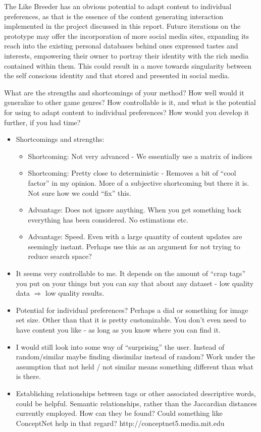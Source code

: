 \documentclass[]{article}
\begin{document}
The Like Breeder has an obvious potential to adapt content to individual preferences, as that is the essence of the content generating interaction implemented in the project discussed in this report.  Future iterations on the prototype may offer the incorporation of more social media sites, expanding its reach into the existing personal databases behind ones expressed tastes and interests, empowering their owner to portray their identity with the rich media contained within them.  This could result in a move towards singularity between the self conscious identity and that stored and presented in social media.

\begin{framed}
What are the strengths and shortcomings of your method? How well would it generalize to other game genres? How controllable is it, and what is the potential for using to adapt content to individual preferences? How would you develop it further, if you had time?
\end{framed}
\begin{itemize}
\item Shortcomings and strengths:
	\begin{itemize}
	\item Shortcoming: Not very advanced - We essentially use a matrix of indices
	\item Shortcoming: Pretty close to deterministic - Removes a bit of ``cool factor'' in my opinion. More of a subjective shortcoming but there it is. Not sure how we could ``fix'' this.
	\item Advantage: Does not ignore anything. When you get something back everything has been considered. No estimations etc.
	\item Advantage: Speed. Even with a large quantity of content updates are seemingly instant. Perhaps use this as an argument for not trying to reduce search space?
	\end{itemize}
\item  It seems very controllable to me. It depends on the amount of ``crap tags'' you put on your things but you can say that about any dataset - low quality data $\Rightarrow$ low quality results. 
\item Potential for individual preferences? Perhaps a dial or something for image set size. Other than that it is pretty customizable. You don't even need to have content you like - as long as you know where you can find it.
\item I would still look into some way of ``surprising'' the user. Instead of random/similar maybe finding dissimilar instead of random? Work under the assumption that not held / not similar means something different than what is there.

\item Establishing relationships between tags or other associated descriptive words, could be helpful. Semantic relationships, rather than the Jaccardian distances currently employed.  How can they be found?  Could something like ConceptNet help in that regard?  http://conceptnet5.media.mit.edu  

\end{itemize}
\end{document}
